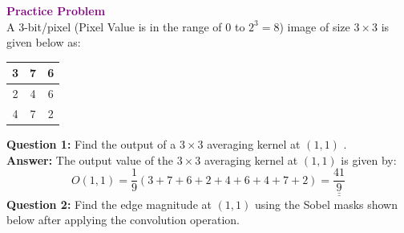 \documentclass{book}
\begin{document}
\newpage
\textbf{\textcolor{purple}{\Large{Practice Problem}}}\\
A 3-bit/pixel (Pixel Value is in the range of $0$ to $2^3 = 8$) image of size $3 \times 3$ is given below as:
\begin{center}
    \begin{tabular}{|c|c|c|}
        \hline
        3 & 7 & 6 \\
        \hline
        2 & 4 & 6 \\
        \hline
        4 & 7 & 2 \\
        \hline
    \end{tabular}
\end{center}
\textbf{Question 1:} Find the output of a $3 \times 3$ averaging kernel at $(1,1)$ .\\
\textbf{Answer:} The output value of the $3 \times 3$ averaging kernel at $(1,1)$ is given by:
\[
    O(1,1) = \frac{1}{9} \left(3 + 7 + 6 + 2 + 4 + 6 + 4 + 7 + 2\right) = \underline{\underline{\frac{41}{9}}}
\]
\textbf{Question 2:} Find the edge magnitude at $(1,1)$ using the Sobel masks shown below after applying the convolution operation.\\
    \begin{center}
    \end{center}
\end{document}
